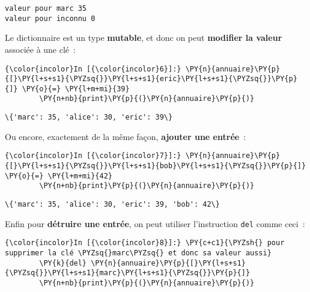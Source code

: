     \begin{Verbatim}[commandchars=\\\{\},frame=single,framerule=0.3mm,rulecolor=\color{cellframecolor}]
valeur pour marc 35
valeur pour inconnu 0
\end{Verbatim}

    Le dictionnaire est un type \textbf{mutable}, et donc on peut
\textbf{modifier la valeur} associée à une clé~:

    \begin{Verbatim}[commandchars=\\\{\},frame=single,framerule=0.3mm,rulecolor=\color{cellframecolor}]
{\color{incolor}In [{\color{incolor}6}]:} \PY{n}{annuaire}\PY{p}{[}\PY{l+s+s1}{\PYZsq{}}\PY{l+s+s1}{eric}\PY{l+s+s1}{\PYZsq{}}\PY{p}{]} \PY{o}{=} \PY{l+m+mi}{39}
        \PY{n+nb}{print}\PY{p}{(}\PY{n}{annuaire}\PY{p}{)}
\end{Verbatim}


    \begin{Verbatim}[commandchars=\\\{\},frame=single,framerule=0.3mm,rulecolor=\color{cellframecolor}]
\{'marc': 35, 'alice': 30, 'eric': 39\}
\end{Verbatim}

    Ou encore, exactement de la même façon, \textbf{ajouter une entrée}~:

    \begin{Verbatim}[commandchars=\\\{\},frame=single,framerule=0.3mm,rulecolor=\color{cellframecolor}]
{\color{incolor}In [{\color{incolor}7}]:} \PY{n}{annuaire}\PY{p}{[}\PY{l+s+s1}{\PYZsq{}}\PY{l+s+s1}{bob}\PY{l+s+s1}{\PYZsq{}}\PY{p}{]} \PY{o}{=} \PY{l+m+mi}{42}
        \PY{n+nb}{print}\PY{p}{(}\PY{n}{annuaire}\PY{p}{)}
\end{Verbatim}


    \begin{Verbatim}[commandchars=\\\{\},frame=single,framerule=0.3mm,rulecolor=\color{cellframecolor}]
\{'marc': 35, 'alice': 30, 'eric': 39, 'bob': 42\}
\end{Verbatim}

    Enfin pour \textbf{détruire une entrée}, on peut utiliser l'instruction
\texttt{del} comme ceci~:

    \begin{Verbatim}[commandchars=\\\{\},frame=single,framerule=0.3mm,rulecolor=\color{cellframecolor}]
{\color{incolor}In [{\color{incolor}8}]:} \PY{c+c1}{\PYZsh{} pour supprimer la clé \PYZsq{}marc\PYZsq{} et donc sa valeur aussi}
        \PY{k}{del} \PY{n}{annuaire}\PY{p}{[}\PY{l+s+s1}{\PYZsq{}}\PY{l+s+s1}{marc}\PY{l+s+s1}{\PYZsq{}}\PY{p}{]}
        \PY{n+nb}{print}\PY{p}{(}\PY{n}{annuaire}\PY{p}{)}
\end{Verbatim}


